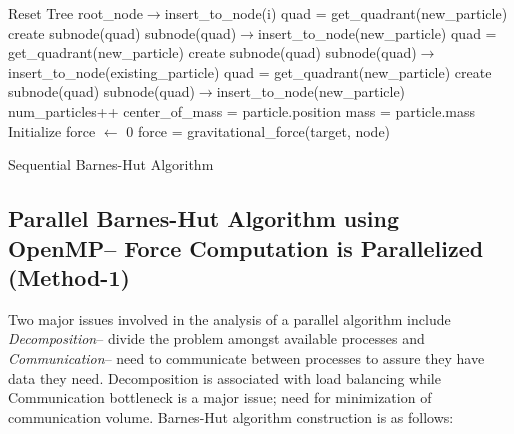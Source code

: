 \begin{algorithm}
\DontPrintSemicolon
{}
 {
  Reset Tree \;
   {
    root\_node$\rightarrow$insert\_to\_node(i) \;
  }
}
\BlankLine
{}
 {
   {
    quad = get\_quadrant(new\_particle) \;
     {
      create subnode(quad) \;
    }
    subnode(quad)$\rightarrow$insert\_to\_node(new\_particle)
  } {
    quad = get\_quadrant(new\_particle) \;
     {
      create subnode(quad) \;
    }
    subnode(quad)$\rightarrow$insert\_to\_node(existing\_particle)\;
    quad = get\_quadrant(new\_particle) \;
     {
      create subnode(quad) \;
    }
    subnode(quad)$\rightarrow$insert\_to\_node(new\_particle)\;
  }
  num\_particles++ \;
}
\BlankLine
{}
 {
   {
    center\_of\_mass = particle.position \;
    mass = particle.mass \;
  }
}
\BlankLine
{}
 {
  Initialize force $\leftarrow$ 0 \;
   {
    force = gravitational\_force(target, node) \;
  }
}
\BlankLine
{}
 {
}
\label{algo:4}
\caption{Sequential Barnes-Hut Algorithm}
\end{algorithm}

\subsection{Parallel Barnes-Hut Algorithm using OpenMP{--} Force Computation is Parallelized (Method-1)}

Two major issues involved in the analysis of a parallel algorithm include \textit{Decomposition}{--} divide the problem amongst available processes and \textit{Communication}{--} need to communicate between processes to assure they have data they need. Decomposition is associated with load balancing while Communication bottleneck is a major issue; need for minimization of  communication volume. Barnes-Hut algorithm construction is as follows:


